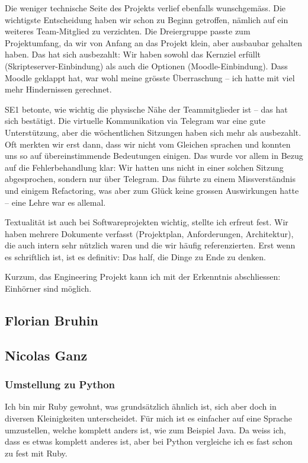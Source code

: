 \documentclass[a4paper]{article}
\begin{document}
Die weniger technische Seite des Projekts verlief ebenfalls wunschgemäss. Die wichtigste Entscheidung haben wir schon zu Beginn getroffen, nämlich auf ein weiteres Team-Mitglied zu verzichten. Die Dreiergruppe passte zum Projektumfang, da wir von Anfang an das Projekt klein, aber ausbaubar gehalten haben. Das hat sich ausbezahlt: Wir haben sowohl das Kernziel erfüllt (Skripteserver-Einbindung) als auch die Optionen (Moodle-Einbindung). Dass Moodle geklappt hat, war wohl meine grösste Überraschung -- ich hatte mit viel mehr Hindernissen gerechnet.

SE1 betonte, wie wichtig die physische Nähe der Teammitglieder ist -- das hat sich bestätigt. Die virtuelle Kommunikation via Telegram war eine gute Unterstützung, aber die wöchentlichen Sitzungen haben sich mehr als ausbezahlt. Oft merkten wir erst dann, dass wir nicht vom Gleichen sprachen und konnten uns so auf übereinstimmende Bedeutungen einigen. Das wurde vor allem in Bezug auf die Fehlerbehandlung klar: Wir hatten uns nicht in einer solchen Sitzung abgesprochen, sondern nur über Telegram. Das führte zu einem Missverständnis und einigem Refactoring, was aber zum Glück keine grossen Auswirkungen hatte -- eine Lehre war es allemal.

Textualität ist auch bei Softwareprojekten wichtig, stellte ich erfreut fest. Wir haben mehrere Dokumente verfasst (Projektplan, Anforderungen, Architektur), die auch intern sehr nützlich waren und die wir häufig referenzierten. Erst wenn es schriftlich ist, ist es definitiv: Das half, die Dinge zu Ende zu denken.

Kurzum, das Engineering Projekt kann ich mit der Erkenntnis abschliessen: Einhörner sind möglich.

  \subsection{Florian Bruhin}


  \subsection{Nicolas Ganz}

  \subsubsection{Umstellung zu Python}

  Ich bin mir Ruby gewohnt, was grundsätzlich ähnlich ist, sich aber doch in diversen Kleinigkeiten unterscheidet.
  Für mich ist es einfacher auf eine Sprache umzustellen, welche komplett anders ist, wie zum Beispiel Java.
  Da weiss ich, dass es etwas komplett anderes ist, aber bei Python vergleiche ich es fast schon zu fest mit Ruby.
\end{document}
